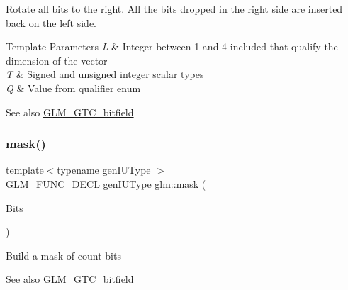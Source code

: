 Rotate all bits to the right. All the bits dropped in the right side are inserted back on the left side.


\begin{DoxyTemplParams}{Template Parameters}
{\em L} & Integer between 1 and 4 included that qualify the dimension of the vector \\
\hline
{\em T} & Signed and unsigned integer scalar types \\
\hline
{\em Q} & Value from qualifier enum\\
\hline
\end{DoxyTemplParams}
\begin{DoxySeeAlso}{See also}
\mbox{\hyperlink{group__gtc__bitfield}{G\+L\+M\+\_\+\+G\+T\+C\+\_\+bitfield}} 
\end{DoxySeeAlso}
\mbox{\label{group__gtc__bitfield_gad7eba518a0b71662114571ee76939f8a}} 
\subsubsection{\texorpdfstring{mask()}{mask()}\hspace{0.1cm}{\footnotesize\ttfamily [1/2]}}
{\footnotesize\ttfamily template$<$typename gen\+I\+U\+Type $>$ \\
\mbox{\hyperlink{setup_8hpp_ab2d052de21a70539923e9bcbf6e83a51}{G\+L\+M\+\_\+\+F\+U\+N\+C\+\_\+\+D\+E\+CL}} gen\+I\+U\+Type glm\+::mask (\begin{DoxyParamCaption}\item[{gen\+I\+U\+Type}]{Bits }\end{DoxyParamCaption})}

Build a mask of \textquotesingle{}count\textquotesingle{} bits

\begin{DoxySeeAlso}{See also}
\mbox{\hyperlink{group__gtc__bitfield}{G\+L\+M\+\_\+\+G\+T\+C\+\_\+bitfield}} 
\end{DoxySeeAlso}
\mbox{\label{group__gtc__bitfield_ga2e64e3b922a296033b825311e7f5fff1}} 
